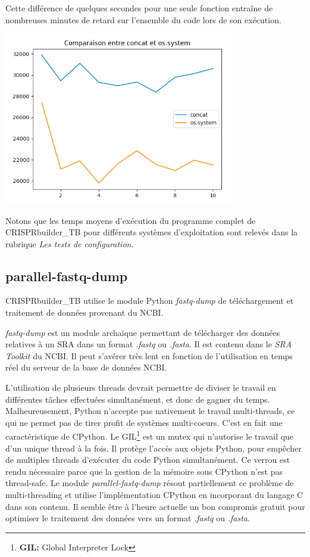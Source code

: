 \documentclass[twoside,a4paper,11pt,frenchb,openany]{report}
\begin{document}
Cette différence de quelques secondes pour une seule fonction entraîne de nombreuses minutes de retard sur l'ensemble du code lors de son exécution. 

\includegraphics[width=10cm]{comparaison_concat.png}

Notons que les temps moyens d'exécution du programme complet de CRISPRbuilder\_TB pour différents systèmes d'exploitation sont relevés dans la rubrique \textit{Les tests de configuration}.




\subsection{parallel-fastq-dump}

CRISPRbuilder\_TB utilise le module Python \textit{fastq-dump} de téléchargement et traitement de données provenant du NCBI.

\textit{fastq-dump} est un module archaïque permettant de télécharger des données relatives à un SRA dans un format \textit{.fastq} ou \textit{.fasta}. Il est contenu dans le \textit{SRA Toolkit} du NCBI. Il peut s'avérer très lent en fonction de l'utilisation en temps réel du serveur de la base de données NCBI. 

L'utilisation de plusieurs threads devrait permettre de diviser le travail en différentes tâches effectuées simultanément, et donc de gagner du temps. Malheureusement, Python n'accepte pas nativement le travail multi-threads, ce qui ne permet pas de tirer profit de systèmes multi-coeurs. C'est en fait une caractéristique de CPython. Le GIL\footnote{\textbf{GIL:} Global Interpreter Lock} est un mutex qui n'autorise le travail que d'un unique thread à la fois. Il protège l'accès aux objets Python, pour empêcher de multiples threads d'exécuter du code Python simultanément. Ce verrou est rendu nécessaire parce que la gestion de la mémoire sous CPython n'est pas thread-safe. Le module \textit{parallel-fastq-dump} résout partiellement ce problème de multi-threading et utilise l'implémentation CPython en incorporant du langage C dans son contenu. Il semble être à l'heure actuelle un bon compromis gratuit pour optimiser le traitement des données vers un format \textit{.fastq} ou \textit{.fasta}. 
\end{document}
